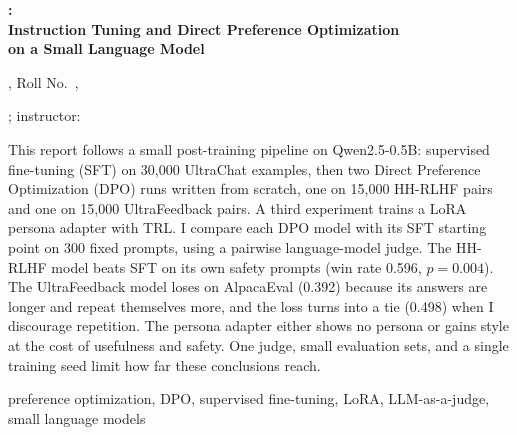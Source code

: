\thispagestyle{firstpage}
\begin{flushleft}
{\sffamily\bfseries\fontsize{17}{20.5}\selectfont \reportassignment:\\ Instruction Tuning and Direct Preference Optimization\\ on a Small Language Model\par}
\vspace{0.8em}
{\sffamily\bfseries\normalsize \reportauthor\par}
{\sffamily\small \reportprogram, Roll No.\ \reportroll, \reportinstitution\par}
{\sffamily\small \reportcourse; instructor: \reportinstructor\par}
\end{flushleft}
\vspace{0.3em}

\par\vspace{2pt}
{\small\noindent This report follows a small post-training pipeline on Qwen2.5-0.5B: supervised fine-tuning (SFT) on 30,000 UltraChat examples, then two Direct Preference Optimization (DPO) runs written from scratch, one on 15,000 HH-RLHF pairs and one on 15,000 UltraFeedback pairs. A third experiment trains a LoRA persona adapter with TRL. I compare each DPO model with its SFT starting point on 300 fixed prompts, using a pairwise language-model judge. The HH-RLHF model beats SFT on its own safety prompts (win rate 0.596, $p=0.004$). The UltraFeedback model loses on AlpacaEval (0.392) because its answers are longer and repeat themselves more, and the loss turns into a tie (0.498) when I discourage repetition. The persona adapter either shows no persona or gains style at the cost of usefulness and safety. One judge, small evaluation sets, and a single training seed limit how far these conclusions reach.\par}
\vspace{0.4em}
 {\small preference optimization, DPO, supervised fine-tuning, LoRA, LLM-as-a-judge, small language models\par}
\vspace{0.2em}
